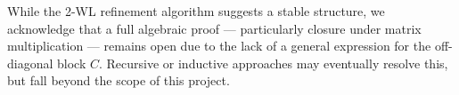 While the 2-WL refinement algorithm suggests a stable structure, we acknowledge that a full algebraic proof — particularly closure under matrix multiplication — remains open due to the lack of a general expression for the off-diagonal block $C$. Recursive or inductive approaches may eventually resolve this, but fall beyond the scope of this project.







